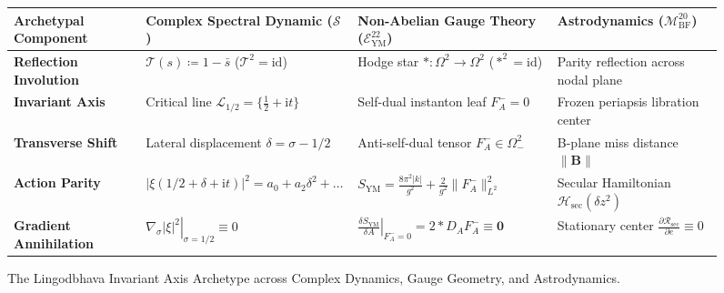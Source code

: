 \documentclass[11pt,a4paper,reqno]{article}
\theoremstyle{plain}
\theoremstyle{definition}
\theoremstyle{remark}
\numberwithin{equation}{section}
\numberwithin{table}{section}
\newcommand{\MbfTwenty}{\mathcal{M}_{\mathrm{BF}}^{20}}
\newcommand{\Eym}{\mathcal{E}_{\mathrm{YM}}^{22}}
\begin{document}
\begin{figure}[H]
\centering
\small
\caption{The Lingodbhava Invariant Axis Archetype across Complex Dynamics, Gauge Geometry, and Astrodynamics.}
\label{fig:lingodbhava_archetype}
\begin{tabularx}{\textwidth}{P{3.4cm}YYY}
\toprule
\textbf{Archetypal Component} & \textbf{Complex Spectral Dynamic ($\mathcal{S}$)} & \textbf{Non-Abelian Gauge Theory ($\Eym$)} & \textbf{Astrodynamics ($\MbfTwenty$)} \\
\midrule
\textbf{Reflection Involution} & $\mathcal{T}(s) \coloneqq 1 - \bar{s}$ ($\mathcal{T}^2 = \mathrm{id}$) & Hodge star $* \colon \Omega^2 \to \Omega^2$ ($*^2 = \mathrm{id}$) & Parity reflection across nodal plane \\
\textbf{Invariant Axis} & Critical line $\mathcal{L}_{1/2} = \{\frac{1}{2} + \mathrm{i}t\}$ & Self-dual instanton leaf $F_A^- = 0$ & Frozen periapsis libration center \\
\textbf{Transverse Shift} & Lateral displacement $\delta = \sigma - 1/2$ & Anti-self-dual tensor $F_A^- \in \Omega^2_-$ & B-plane miss distance $\|\bm{B}\|$ \\
\textbf{Action Parity} & $|\xi(1/2+\delta+\mathrm{i}t)|^2 = a_0 + a_2\delta^2 + \dots$ & $S_{\mathrm{YM}} = \frac{8\pi^2|k|}{g^2} + \frac{2}{g^2}\|F_A^-\|_{L^2}^2$ & Secular Hamiltonian $\mathcal{H}_{\mathrm{sec}}(\delta z^2)$ \\
\textbf{Gradient Annihilation} & $\left.\nabla_\sigma |\xi|^2\right|_{\sigma=1/2} \equiv 0$ & $\left.\frac{\delta S_{\mathrm{YM}}}{\delta A}\right|_{F_A^- = 0} = 2*D_A F_A^- \equiv \mathbf{0}$ & Stationary center $\frac{\partial \mathcal{R}_{\mathrm{sec}}}{\partial e} \equiv 0$ \\
\bottomrule
\end{tabularx}
\end{figure}
\end{document}

